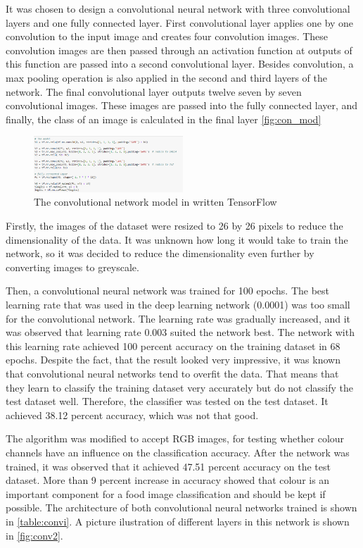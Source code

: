 It was chosen to design a convolutional neural network with three convolutional layers and one fully connected layer. First convolutional layer applies one by one convolution to the input image and creates four convolution images. These convolution images are then passed through an activation function at outputs of this function are passed into a second convolutional layer. Besides convolution, a max pooling operation is also applied in the second and third layers of the network. The final convolutional layer outputs twelve seven by seven convolutional images. These images are passed into the fully connected layer, and finally, the class of an image is calculated in the final layer \autoref{fig:con_mod}



\begin{figure}[h]
\centering
\includegraphics[width=0.5\textwidth]{Figures/4/conv.PNG}
\caption{The convolutional network model in written TensorFlow}
\label{fig:con_mod}
\end{figure}

Firstly, the images of the dataset were resized to 26 by 26 pixels to reduce the dimensionality of the data.
It was unknown how long it would take to train the network, so it was decided to reduce the dimensionality even further by converting images to greyscale.

Then, a convolutional neural network was trained for 100 epochs. The best learning rate that was used in the deep learning network (0.0001) was too small for the convolutional network. The learning rate was gradually increased, and it was observed that learning rate 0.003 suited the network best. The network with this learning rate achieved 100 percent accuracy on the training dataset in 68 epochs. Despite the fact, that the result looked very impressive, it was known that convolutional neural networks tend to overfit the data. That means that they learn to classify the training dataset very accurately but do not classify the test dataset well. Therefore, the classifier was tested on the test dataset. It achieved 38.12 percent accuracy, which was not that good.

The algorithm was modified to accept RGB images, for testing whether colour channels have an influence on the classification accuracy. After the network was trained, it was observed that it achieved 47.51 percent accuracy on the test dataset. More than 9 percent increase in accuracy showed that colour is an important component for a food image classification and should be kept if possible. The architecture of both convolutional neural networks trained is shown in \autoref{table:convi}. A picture ilustration of different layers in this network is shown in \autoref{fig:conv2}.

